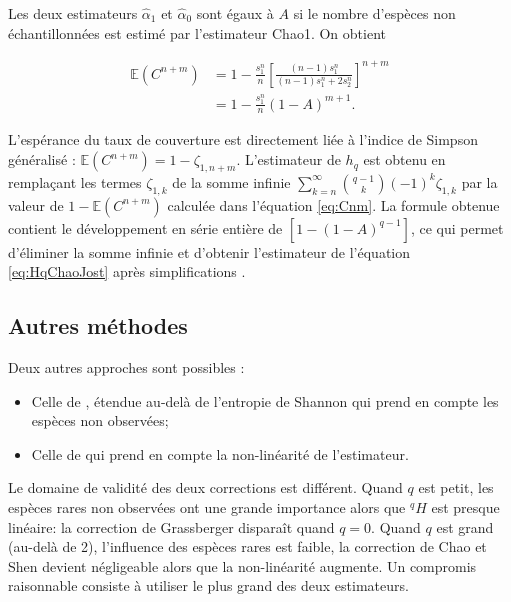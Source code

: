 \documentclass[
  11pt,
  french,
  a4paper,
  extrafontsizes,onecolumn,openright
  ]{memoir}
\providecommand{\tightlist}{%
  \setlength{\itemsep}{0pt}\setlength{\parskip}{0pt}}
\begin{document}
Les deux estimateurs \(\hat{\alpha}_1\) et \(\hat{\alpha}_0\) sont égaux à \(A\) si le nombre d'espèces non échantillonnées est estimé par l'estimateur Chao1.
On obtient

\begin{align} 
  \label{eq:Cnm}
  {\mathbb E}\left(C^{n+m} \right)
  &= 1-\frac{s^{n}_{1}}{n} 
    \left[ \frac{\left(n-1\right)s^{n}_{1}}{\left(n-1\right)s^{n}_{1}+2s^{n}_{2}} \right]^{n+m} \\
  &= 1-\frac{s^{n}_{1}}{n} \left( 1-A \right)^{m+1}.
\end{align}

L'espérance du taux de couverture est directement liée à l'indice de Simpson généralisé \autocite{Good1953}: \({\mathbb E}(C^{n+m}) = 1 - \zeta_{1,n+m}\).
L'estimateur de \(h_q\) est obtenu en remplaçant les termes \(\zeta_{1,k}\) de la somme infinie \(\sum_{k=n}^{\infty}{\binom{q-1}{k}(-1)^k \zeta_{1,k}}\) par la valeur de \(1 -{\mathbb E}(C^{n+m})\) calculée dans l'équation \eqref{eq:Cnm}.
La formule obtenue contient le développement en série entière de \([1 - (1-A)^{q-1}]\), ce qui permet d'éliminer la somme infinie et d'obtenir l'estimateur de l'équation \eqref{eq:HqChaoJost} après simplifications \autocite[Appendix S1, Theorem S1.2d]{Chao2015}.

\subsection{Autres méthodes}\label{autres-muxe9thodes}

Deux autres approches sont possibles \autocite{Marcon2014a}:

\begin{itemize}
\tightlist
\item
  Celle de \textcite{Chao2003}, étendue au-delà de l'entropie de Shannon qui prend en compte les espèces non observées;
\item
  Celle de \textcite{Grassberger1988} qui prend en compte la non-linéarité de l'estimateur.
\end{itemize}

Le domaine de validité des deux corrections est différent.
Quand \(q\) est petit, les espèces rares non observées ont une grande importance alors que \(^{q}\!H\) est presque linéaire: la correction de Grassberger disparaît quand \(q=0\).
Quand \(q\) est grand (au-delà de 2), l'influence des espèces rares est faible, la correction de Chao et Shen devient négligeable alors que la non-linéarité augmente.
Un compromis raisonnable consiste à utiliser le plus grand des deux estimateurs.
\end{document}
